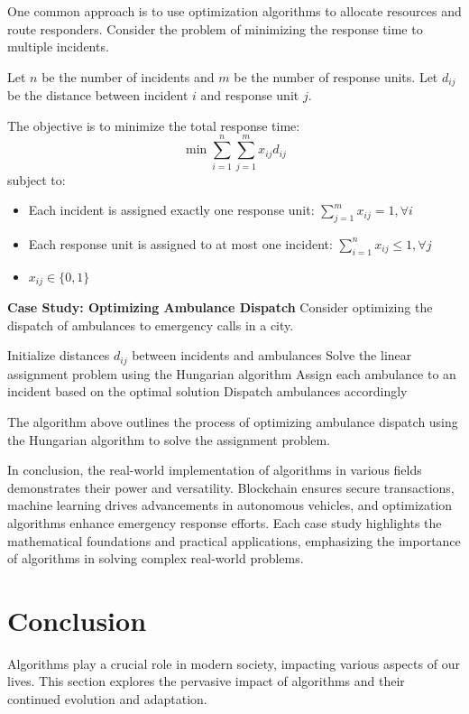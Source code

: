 \documentclass[12pt]{book} %
\begin{document}
One common approach is to use optimization algorithms to allocate resources and route responders. Consider the problem of minimizing the response time to multiple incidents.

Let $n$ be the number of incidents and $m$ be the number of response units. Let $d_{ij}$ be the distance between incident $i$ and response unit $j$.

The objective is to minimize the total response time:
\[
\min \sum_{i=1}^{n} \sum_{j=1}^{m} x_{ij} d_{ij}
\]
subject to:
\begin{itemize}
    \item Each incident is assigned exactly one response unit: $\sum_{j=1}^{m} x_{ij} = 1, \forall i$
    \item Each response unit is assigned to at most one incident: $\sum_{i=1}^{n} x_{ij} \leq 1, \forall j$
    \item $x_{ij} \in \{0, 1\}$
\end{itemize}

\textbf{Case Study: Optimizing Ambulance Dispatch}
Consider optimizing the dispatch of ambulances to emergency calls in a city.
\FloatBarrier
\begin{algorithm}
\caption{Ambulance Dispatch Optimization}
\begin{algorithmic}[1]
\State Initialize distances $d_{ij}$ between incidents and ambulances
\State Solve the linear assignment problem using the Hungarian algorithm
\State Assign each ambulance to an incident based on the optimal solution
\State Dispatch ambulances accordingly
\end{algorithmic}
\end{algorithm}
\FloatBarrier

The algorithm above outlines the process of optimizing ambulance dispatch using the Hungarian algorithm to solve the assignment problem.

In conclusion, the real-world implementation of algorithms in various fields demonstrates their power and versatility. Blockchain ensures secure transactions, machine learning drives advancements in autonomous vehicles, and optimization algorithms enhance emergency response efforts. Each case study highlights the mathematical foundations and practical applications, emphasizing the importance of algorithms in solving complex real-world problems.


\section{Conclusion}
Algorithms play a crucial role in modern society, impacting various aspects of our lives. This section explores the pervasive impact of algorithms and their continued evolution and adaptation.
\end{document}
